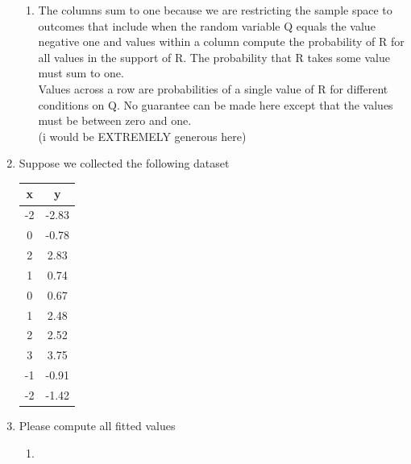 \documentclass[krantz1,ChapterTOCs]{krantz}
\begin{document}
\begin{enumerate}
    \begin{enumerate}
        \item {\color{red}
        The columns sum to one because we are restricting the sample space to outcomes that include when the random variable Q equals the value negative one and values within a column compute the probability of R for all values in the support of R. The probability that R takes some value must sum to one.\\
        
        Values across a row are probabilities of a single value of R for different conditions on Q. No guarantee can be made here except that the values must be between zero and one.\\
        
        (i would be EXTREMELY generous here)
        }
    \end{enumerate}
    
    \item Suppose we collected the following dataset
    \begin{table}[ht!]
        \centering
        \begin{tabular}{c|c}
            x & y \\
            \hline
            -2  & -2.83  \\ 
            0   &  -0.78 \\ 
            2   &  2.83  \\ 
            1   &  0.74  \\ 
            0   &  0.67  \\ 
            1   &  2.48  \\ 
            2   &  2.52  \\ 
            3   &  3.75  \\ 
            -1  &  -0.91 \\ 
            -2  &  -1.42 \\ 
        \end{tabular}
    \end{table}
    
        \item Please compute all fitted values
        \begin{enumerate}
            \item {\color{red}
            
}
\end{enumerate}
\end{enumerate}
\end{document}
